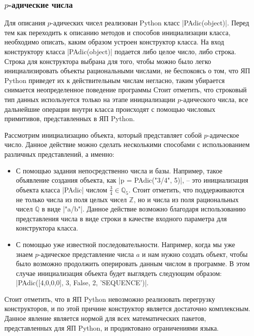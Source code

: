 \documentclass[master, och, times, pract]{sty/SCWorks}
\theoremstyle{plain}
\theoremstyle{definition}
\numberwithin{equation}{section}
\begin{document}
\subsubsection{$p$-адические числа}

Для описания $p$-адических чисел реализован Python класс |PAdic(object)|. Перед тем как переходить к описанию методов и способов инициализации класса, необходимо описать, каким образом устроен конструктор класса. На вход конструктору класса |PAdic(object)| подается либо целое число, либо строка. Строка для конструктора выбрана для того, чтобы можно было легко инициализировать объекты рациональными числами, не беспокоясь о том, что ЯП Python приведет их к действительным числам негласно, таким убирается снимается неопределенное поведение программы Стоит отметить, что строковый тип данных используется только на этапе инициализации $p$-адического числа, все дальнейшие операции внутри класса происходят с помощью числовых примитивов, представленных в ЯП Python.

Рассмотрим инициализацию объекта, который представляет собой $p$-адическое число. Данное действие можно сделать несколькими способами с использованием различных представлений, а именно:

 \begin{itemize}
 \item С помощью задания непосредственно числа и базы. Например, такое объявление создания объекта, как |p = PAdic("3/4", 5)|, -- это инициализация объекта класса |PAdic| числом \mbox{$\frac{3}{4} \in \mathbb{Q}_5$}. Стоит отметить, что поддерживаются не \mbox{только} числа из поля целых чисел $\mathbb{Z}$, но и числа из поля рациональных чисел $\mathbb{Q}$ в виде |"a/b"|. Данное действие возможно благодаря использованию представления числа в виде строки в качестве входного параметра для конструктора класса.
 \item С помощью уже известной последовательности. Например, когда мы уже знаем $p$-адическое представление числа $a$ и нам нужно создать объект, чтобы было возможно продолжить оперировать данным числом в программе. В этом случае инициализация объекта будет выглядеть следующим образом: |PAdic({[4,0,0,0], 3, False}, 2, 'SEQUENCE')|.
 \end{itemize}

Стоит отметить, что в ЯП Python невозможно реализовать перегрузку конструкторов, и по этой причине конструктор является достаточно комплексным. Данное явление является нормой для всех математических пакетов, представленных для ЯП Python, и продиктовано ограничениями языка.
\end{document}
